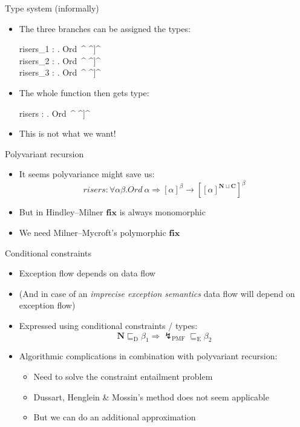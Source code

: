 \documentclass{beamer}
\newcommand{\N}[1]{[#1]^{\mathbf{N}}}
\newcommand{\C}[1]{[#1]^{\mathbf{C}}}
\newcommand{\NC}[1]{[#1]^{\mathbf{N}\sqcup\mathbf{C}}}
\newcommand{\POLYV}[2]{[#1]^{#2}}
\begin{document}
\begin{frame}{Type system (informally)}
	\begin{itemize}
		\item The three branches can be assigned the types:
			\begin{flalign*}
				risers_1 : \forall \alpha. Ord\ \alpha \Rightarrow \N{\alpha} \to \N{\NC{\alpha}}\\
				risers_2 : \forall \alpha. Ord\ \alpha \Rightarrow \C{\alpha} \to \C{\NC{\alpha}}\\
				risers_3 : \forall \alpha. Ord\ \alpha \Rightarrow \C{\alpha} \to \C{\NC{\alpha}}
			\end{flalign*}
		\item The whole function then gets type:
			\begin{flalign*}
				risers : \forall \alpha. Ord\ \alpha \Rightarrow \NC{\alpha} \to \NC{\NC{\alpha}}
			\end{flalign*}
		\item This is not what we want!
	\end{itemize}
\end{frame}

\begin{frame}{Polyvariant recursion}
	\begin{itemize}
		\item It seems polyvariance might save us: \[ risers : \forall \alpha\beta. Ord\ \alpha \Rightarrow \POLYV{\alpha}{\beta} \to \POLYV{\NC{\alpha}}{\beta} \]
		\item But in Hindley--Milner $\mathbf{fix}$ is always monomorphic
		\item We need Milner--Mycroft's polymorphic $\mathbf{fix}$
	\end{itemize}
\end{frame}

\begin{frame}{Conditional constraints}
	\begin{itemize}
		\item Exception flow depends on data flow
		\item (And in case of an \emph{imprecise exception semantics} data flow will depend on exception flow)
		\item Expressed using conditional constraints / types: \[ \mathbf{N} \sqsubseteq_{\text{D}} \beta_1 \Longrightarrow \lightning_{\text{PMF}} \sqsubseteq_{\text{E}} \beta_2 \]
		\item Algorithmic complications in combination with polyvariant recursion:
		\begin{itemize}
			\item Need to solve the constraint entailment problem
			\item Dussart, Henglein \& Mossin's method does not seem applicable
			\item But we can do an additional approximation
		\end{itemize}
	\end{itemize}
\end{frame}
\end{document}

